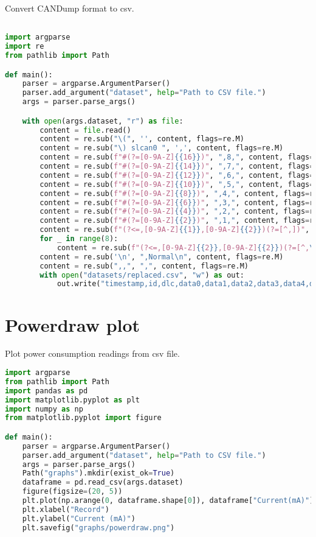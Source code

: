 Convert CANDump format to \gls{csv}.

\begin{lstlisting}[language=Python]

import argparse
import re
from pathlib import Path

def main():
    parser = argparse.ArgumentParser()
    parser.add_argument("dataset", help="Path to CSV file.")
    args = parser.parse_args()

    with open(args.dataset, "r") as file:
        content = file.read()
        content = re.sub("\(", '', content, flags=re.M)
        content = re.sub("\) slcan0 ", ',', content, flags=re.M)
        content = re.sub(f"#(?=[0-9A-Z]{{16}})", ",8,", content, flags=re.M)
        content = re.sub(f"#(?=[0-9A-Z]{{14}})", ",7,", content, flags=re.M)
        content = re.sub(f"#(?=[0-9A-Z]{{12}})", ",6,", content, flags=re.M)
        content = re.sub(f"#(?=[0-9A-Z]{{10}})", ",5,", content, flags=re.M)
        content = re.sub(f"#(?=[0-9A-Z]{{8}})", ",4,", content, flags=re.M)
        content = re.sub(f"#(?=[0-9A-Z]{{6}})", ",3,", content, flags=re.M)
        content = re.sub(f"#(?=[0-9A-Z]{{4}})", ",2,", content, flags=re.M)
        content = re.sub(f"#(?=[0-9A-Z]{{2}})", ",1,", content, flags=re.M)
        content = re.sub(f"(?<=,[0-9A-Z]{{1}},[0-9A-Z]{{2}})(?=[^,])", ',', content, flags=re.M)
        for _ in range(8):
            content = re.sub(f"(?<=,[0-9A-Z]{{2}},[0-9A-Z]{{2}})(?=[^,\n])", ',', content, flags=re.M)
        content = re.sub('\n', ",Normal\n", content, flags=re.M)
        content = re.sub(",,", ",", content, flags=re.M)
        with open("datasets/replaced.csv", "w") as out:
            out.write("timestamp,id,dlc,data0,data1,data2,data3,data4,data5,data6,data7,label\n" + content)
\end{lstlisting}

\section{Powerdraw plot}

Plot power consumption readings from \gls{csv} file.

\begin{lstlisting}[language=Python]
import argparse
from pathlib import Path
import pandas as pd
import matplotlib.pyplot as plt
import numpy as np
from matplotlib.pyplot import figure

def main():
    parser = argparse.ArgumentParser()
    parser.add_argument("dataset", help="Path to CSV file.")
    args = parser.parse_args()
    Path("graphs").mkdir(exist_ok=True)
    dataframe = pd.read_csv(args.dataset)
    figure(figsize=(20, 5))
    plt.plot(np.arange(0, dataframe.shape[0]), dataframe["Current(mA)"])
    plt.xlabel("Record")
    plt.ylabel("Current (mA)")
    plt.savefig("graphs/powerdraw.png")
\end{lstlisting}